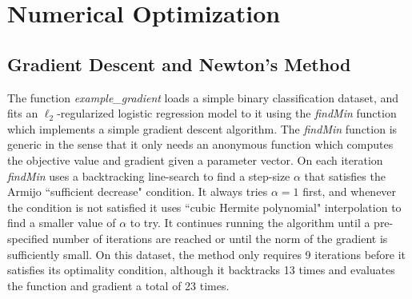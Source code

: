 \documentclass{article}
\begin{document}


\section{Numerical Optimization}

\subsection{Gradient Descent and Newton's Method}

The function \emph{example\_gradient} loads a simple binary classification dataset, and fits an $\ell_2$-regularized logistic regression model to it using the \emph{findMin} function which implements a simple gradient descent algorithm. The \emph{findMin} function is generic in the sense that it only needs an anonymous function which computes the objective value and gradient given a parameter vector. On each iteration \emph{findMin} uses a backtracking line-search to find a step-size $\alpha$ that satisfies the Armijo ``sufficient decrease" condition. It always tries $\alpha = 1$ first, and whenever the condition is not satisfied it uses ``cubic Hermite polynomial" interpolation to find a smaller value of $\alpha$ to try. It continues running the algorithm until a pre-specified number of iterations are reached or until the norm of the gradient is sufficiently small. On this dataset, the method only requires 9 iterations before it satisfies its optimality condition, although it backtracks 13 times and evaluates the function and gradient a total of 23 times.
\end{document}
